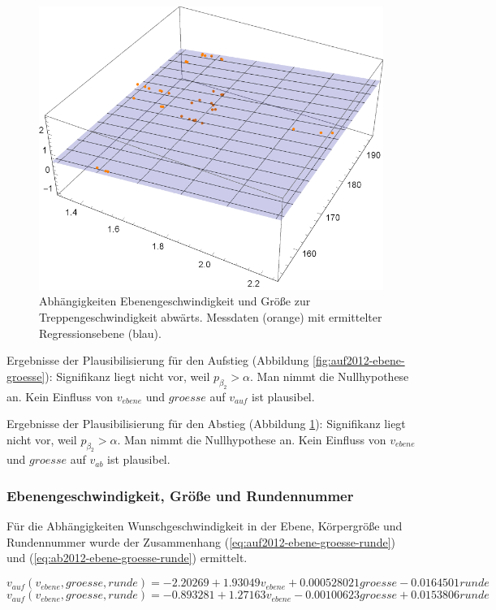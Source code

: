 \begin{figure} \centering 
	\includegraphics[]{abbildungen/regression/2012/ab-ebene-groesse.pdf}
	
	\caption{Abhängigkeiten Ebenengeschwindigkeit und Größe zur Treppengeschwindigkeit abwärts. Messdaten (orange) mit ermittelter Regressionsebene (blau). \label{fig:ab2012-ebene-groesse}}
\end{figure}

Ergebnisse der Plausibilisierung für den Aufstieg
(Abbildung \ref{fig:auf2012-ebene-groesse}):
Signifikanz liegt nicht vor, weil $p_{\beta_2} > \alpha$. Man nimmt die
Nullhypothese an. Kein Einfluss von $v_{ebene}$ und $groesse$ auf $v_{auf}$ ist plausibel.

Ergebnisse der Plausibilisierung für den Abstieg
(Abbildung \ref{fig:ab2012-ebene-groesse}):
Signifikanz liegt nicht vor, weil $p_{\beta_2} > \alpha$. Man nimmt die
Nullhypothese an. Kein Einfluss von $v_{ebene}$ und $groesse$ auf $v_{ab}$ ist plausibel.


\subsubsection{Ebenengeschwindigkeit, Größe und Rundennummer}

Für die Abhängigkeiten Wunschgeschwindigkeit in der Ebene, Körpergröße und Rundennummer wurde 
der Zusammenhang (\ref{eq:auf2012-ebene-groesse-runde}) und (\ref{eq:ab2012-ebene-groesse-runde}) ermittelt.

\begin{equation} \label{eq:auf2012-ebene-groesse-runde}
v_{auf}(v_{ebene}, groesse, runde) = -2.20269 + 1.93049 v_{ebene} + 0.000528021 groesse - 0.0164501  runde
\end{equation}
\begin{equation} \label{eq:ab2012-ebene-groesse-runde}
v_{auf}(v_{ebene}, groesse, runde) = - 0.893281 + 1.27163 v_{ebene} - 0.00100623 groesse + 0.0153806  runde
\end{equation}

